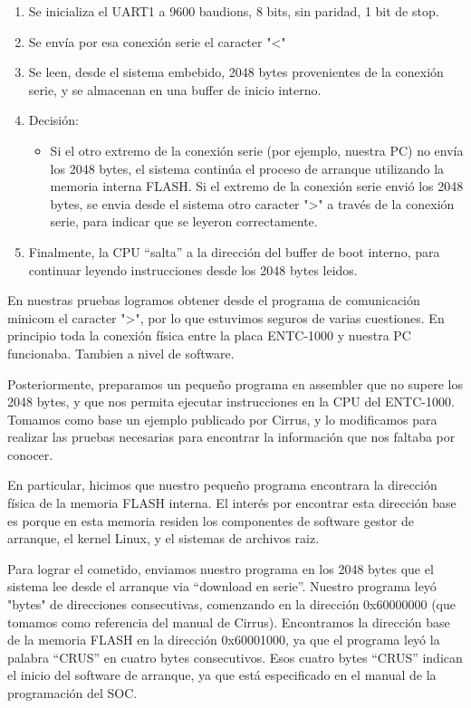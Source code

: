 \documentclass[conference]{IEEEtran}
\begin{document}
\begin{enumerate}
\item Se inicializa el UART1 a 9600 baudions, 8 bits, sin paridad, 1 bit de stop.
\item Se envía por esa conexión serie el caracter "<"
\item Se leen, desde el sistema embebido, 2048 bytes provenientes
de la conexión serie, y se almacenan en una buffer de inicio interno.
\item Decisión:
\begin{itemize}
\item Si el otro extremo de la conexión serie (por ejemplo, nuestra PC) no envía los 2048 bytes, el sistema continúa el proceso de arranque utilizando la memoria interna FLASH.
\itme Si el extremo de la conexión serie envió los 2048 bytes, se envia desde el sistema otro caracter ">" a través de la conexión serie, para indicar que 
se leyeron correctamente.
\end{itemize}
\item Finalmente, la CPU ``salta'' a la dirección del buffer de boot interno,
para continuar leyendo instrucciones desde
los 2048 bytes leidos.
\end{enumerate} 



En nuestras pruebas logramos obtener desde el programa de comunicación minicom
el caracter ">", por lo que estuvimos seguros de varias cuestiones. En principio
toda la conexión física entre la placa ENTC-1000 y nuestra PC funcionaba.
Tambien a nivel de software.

Posteriormente, preparamos un pequeño programa en assembler que no supere
los 2048 bytes, y que nos permita ejecutar instrucciones en la CPU del 
ENTC-1000. Tomamos como base un ejemplo publicado por Cirrus, y lo modificamos
para realizar las pruebas necesarias para encontrar la información que
nos faltaba por conocer.

En particular, hicimos que nuestro pequeño programa encontrara
la dirección física de la memoria FLASH interna.
El interés por encontrar esta dirección
base es porque en esta memoria residen los componentes de software
gestor de arranque, el kernel Linux, y el sistemas de archivos raiz.

Para lograr el cometido, enviamos nuestro programa en los 2048 bytes
que el sistema lee desde el arranque via ``download en serie''.
Nuestro programa leyó "bytes"
de direcciones consecutivas, comenzando en la dirección 0x60000000 (que
tomamos como referencia del manual de Cirrus).
Encontramos la dirección base de la memoria FLASH en 
la dirección 0x60001000, ya que el programa leyó la palabra ``CRUS''
en cuatro bytes consecutivos. Esos cuatro bytes ``CRUS'' indican el inicio
del software de arranque, ya que está especificado en el manual
de la programación del SOC.
\end{document}
